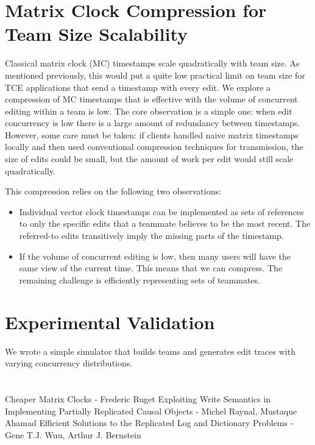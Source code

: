 \documentclass[runningheads]{llncs}
\begin{document}
\section{Matrix Clock Compression for Team Size Scalability}

Classical matrix clock (MC) timestamps scale quadratically with team size.
As mentioned previously, this would put a quite low practical limit on team size for TCE applications that send a timestamp with every edit.
We explore a compression of MC timestamps that is effective with the volume of concurrent editing within a team is low.
The core observation is a simple one: when edit concurrency is low there is a large amount of redundancy between timestamps.
However, some care must be taken: if clients handled naive matrix timestamps locally and then used conventional compression techniques for transmission, the size of edits could be small, but the amount of work per edit would still scale quadratically.

This compression relies on the following two observations:

\begin{itemize}
  \item Individual vector clock timestamps can be implemented as sets of references to only the specific edits that a teammate believes to be the most recent.
    The referred-to edits transitively imply the missing parts of the timestamp.
  \item If the volume of concurrent editing is low, then many users will have the same view of the current time.
    This means that we can compress.
    The remaining challenge is efficiently representing sets of teammates.
\end{itemize}

\section{Experimental Validation}

We wrote a simple simulator that builds teams and generates edit traces with varying concurrency distributions.

\section{}



Cheaper Matrix Clocks - Frederic Ruget
Exploiting Write Semantics in Implementing Partially Replicated Causal Objects - Michel Raynal, Mustaque Ahamad
Efficient Solutions to the Replicated Log and Dictionary Problems - Gene T.J. Wuu, Arthur J. Bernstein
\end{document}
